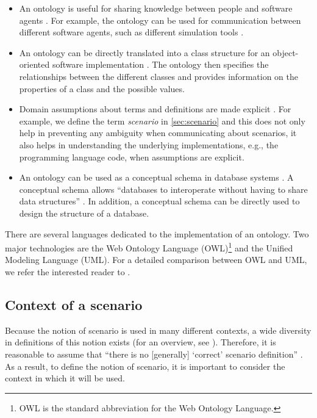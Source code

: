 \begin{itemize}
	\item An ontology is useful for sharing knowledge between people and software agents \autocite{vanDamPhDThesis2009, noy2001ontology}. For example, the ontology can be used for communication between different software agents, such as different simulation tools \autocite{shao2019evaluating}.
	\item An ontology can be directly translated into a class structure for an object-oriented software implementation \autocite{vanDamPhDThesis2009}. The ontology then specifies the relationships between the different classes and provides information on the properties of a class and the possible values.
	\item Domain assumptions about terms and definitions are made explicit \autocite{noy2001ontology}. 
	For example, we define the term \emph{scenario} in \cref{sec:scenario} and  this does not only help in preventing any ambiguity when communicating about scenarios, it also helps in understanding the underlying implementations, e.g., the programming language code, when assumptions are explicit.
	\item An ontology can be used as a conceptual schema in database systems  \autocite{gruber1993ontology}. A conceptual schema allows ``databases to interoperate without having to share data structures'' \autocite{gruber1993ontology}. In addition, a conceptual schema can be directly used to design the structure of a database.
\end{itemize}

There are several languages dedicated to the implementation of an ontology. Two major technologies are the Web Ontology Language (OWL)\footnote{OWL is the standard abbreviation for the Web Ontology Language.} and the Unified Modeling Language (UML). 
For a detailed comparison between OWL and UML, we refer the interested reader to \autocite{kiko2005detailed}.



\subsection{Context of a scenario}
\label{sec:context}

Because the notion of scenario is used in many different contexts, a wide diversity in definitions of this notion exists (for an overview, see \autocite{vannotten2003updated, bishop2007scentechniques}). Therefore, it is reasonable to assume that ``there is no [generally] `correct' scenario definition'' \autocite{vannotten2003updated}. As a result, to define the notion of scenario, it is important to consider the context in which it will be used. 

